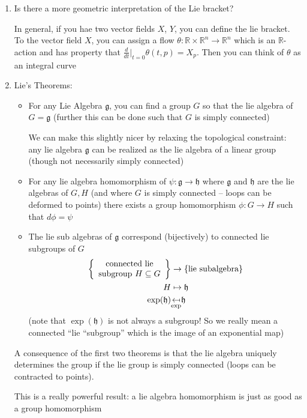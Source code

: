\documentclass[12pt]{article}
\newcommand{\R}{\mathbb{R}}
\newcommand{\g}{\mathfrak{g}}
\newcommand{\h}{\mathfrak{h}}
\begin{document}
\begin{enumerate}
        \item Is there a more geometric interpretation of the Lie bracket?  
        
        In general, if you hae two vector fields $X$, $Y$, you can define the lie bracket. To the vector field $X$, you can assign a flow $\theta: \R \times \R^n \to \R^n$ which is an $\R$-action and has property that $\frac{d}{dt}\bigg\vert_{t=0} \theta(t, p) = X_p$. Then you can think of $\theta$ as an integral curve

        \item Lie's Theorems:
        \begin{itemize}
            \item For any Lie Algebra $\g$, you can find a group $G$ so that the lie algebra of $G = \g$ (further this can be done such that $G$ is simply connected) 
            
            We can make this slightly nicer by relaxing the topological constraint: any lie algebra $\g$ can be realized as the lie algebra of a linear group (though not necessarily simply connected)

            \item For any lie algebra homomorphism of $\psi: \g \to \h$ where $\g$ and $\h$ are the lie algebras of $G, H$ (and where $G$ is simply connected -- loops can be deformed to points) there exists a group homomorphism $\phi: G \to H$ such that $d\phi = \psi$ 
            
            \item The lie sub algebras of $\g$ correspond (bijectively) to connected lie subgroups of $G$
            \begin{align*}
                \left\{\begin{array}{c}
                    \text{connected lie}\\ 
                    \text{subgroup } H \subseteq G
                \end{array}\right\} &\to \{\text{lie subalgebra}\}\\ 
                H &\mapsto \mathfrak{h} \\ 
                \exp(\h) &\underset{\exp}{\reflectbox{$\mapsto$}} \h
            \end{align*}
            (note that $\exp(\h)$ is not always a subgroup! So we really mean a connected ``lie ``subgroup'' which is the image of an exponential map)
        
        \end{itemize}

        A consequence of the first two theorems is that the lie algebra uniquely determines the group if the lie group is simply connected (loops can be contracted to points). 

        This is a really powerful result: a lie algebra homomorphism is just as good as a group homomorphism
    \end{enumerate}
\end{document}
